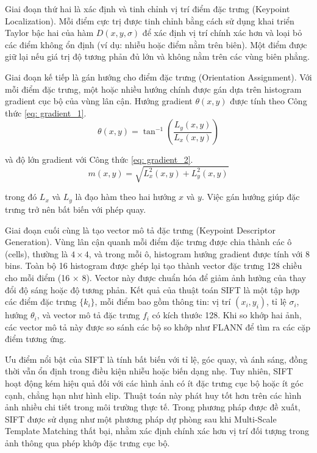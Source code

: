 \documentclass[a4paper, 12pt]{report}
\begin{document}
Giai {} đoạn {} thứ {} hai {} là {} xác {} định {} và {} tinh {} chỉnh {} vị {} trí {} điểm {} đặc {} trưng {} (Keypoint\\ Localization). Mỗi điểm cực trị được tinh chỉnh bằng cách sử dụng khai triển Taylor bậc hai của hàm $D(x, y, \sigma)$ để xác định vị trí chính xác hơn và loại bỏ các điểm không ổn định (ví dụ: nhiễu hoặc điểm nằm trên biên). Một điểm được giữ lại nếu giá trị độ tương phản đủ lớn và không nằm trên các vùng biên phẳng.

Giai đoạn kế tiếp là gán hướng cho điểm đặc trưng (Orientation Assignment). Với mỗi điểm đặc trưng, một hoặc nhiều hướng chính được gán dựa trên histogram gradient cục bộ của vùng lân cận. Hướng gradient $\theta(x, y)$ được tính theo Công thức \ref{eq: gradient_1}.
    \begin{equation}
        \theta(x, y) = \tan^{-1}\left(\frac{L_y(x, y)}{L_x(x, y)}\right)
        \label{eq: gradient_1}
    \end{equation}
    
    và độ lớn gradient với Công thức \ref{eq: gradient_2}.
    \begin{equation}
        m(x, y) = \sqrt{L_x^2(x, y) + L_y^2(x, y)}
        \label{eq: gradient_2}
    \end{equation}
    
    trong đó $L_x$ và $L_y$ là đạo hàm theo hai hướng $x$ và $y$.  
    Việc gán hướng giúp đặc trưng trở nên bất biến với phép quay.

Giai đoạn cuối cùng là tạo vector mô tả đặc trưng (Keypoint Descriptor Generation). Vùng lân cận quanh mỗi điểm đặc trưng được chia thành các ô (cells), thường là $4\times4$, và trong mỗi ô, histogram hướng gradient được tính với 8 bins. Toàn bộ 16 histogram được ghép lại tạo thành vector đặc trưng 128 chiều cho mỗi điểm (16 $\times$ 8). Vector này được chuẩn hóa để giảm ảnh hưởng của thay đổi độ sáng hoặc độ tương phản. Kết quả của thuật toán SIFT là một tập hợp các điểm đặc trưng $\{k_i\}$, mỗi điểm bao gồm thông tin: vị trí $(x_i, y_i)$, tỉ lệ $\sigma_i$, hướng $\theta_i$, và vector mô tả đặc trưng $f_i$ có kích thước 128. Khi so khớp hai ảnh, các vector mô tả này được so sánh các bộ so khớp như FLANN để tìm ra các cặp điểm tương ứng.

Ưu điểm nổi bật của SIFT là tính bất biến với tỉ lệ, góc quay, và ánh sáng, đồng thời vẫn ổn định trong điều kiện nhiễu hoặc biến dạng nhẹ. Tuy nhiên, SIFT hoạt động kém hiệu quả đối với các hình ảnh có ít đặc trưng cục bộ hoặc ít góc cạnh, chẳng hạn như hình elip. Thuật toán này phát huy tốt hơn trên các hình ảnh nhiều chi tiết trong môi trường thực tế. Trong phương pháp được đề xuất, SIFT được sử dụng như một phương pháp dự phòng sau khi Multi-Scale Template Matching thất bại, nhằm xác định chính xác hơn vị trí đối tượng trong ảnh thông qua phép khớp đặc trưng cục bộ.
\end{document}

